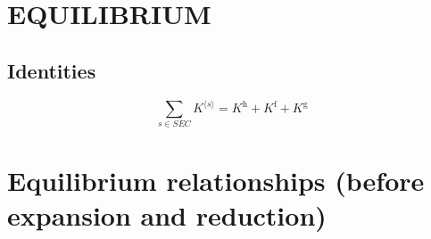 \section{EQUILIBRIUM}

\subsection{Identities}

\begin{equation}
\sum_{s\in {S\!E\!C}} {K}^{\langle s\rangle} = K^{\mathrm{h}} + K^{\mathrm{f}} + K^{\mathrm{g}}
\end{equation}




\section{Equilibrium relationships (before expansion and reduction)}

